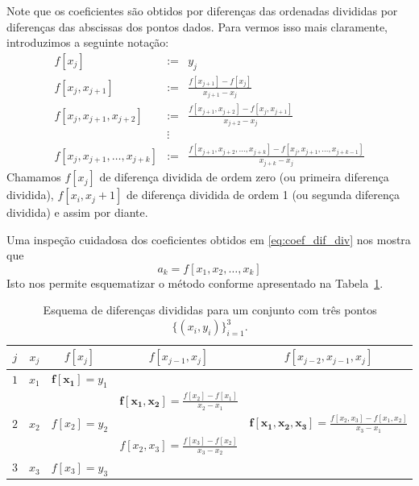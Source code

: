 Note que os coeficientes são obtidos por diferenças das ordenadas divididas por diferenças das abscissas dos pontos dados. Para vermos isso mais claramente, introduzimos a seguinte notação:
\begin{eqnarray}
  f[x_j]&:=&y_j\\
  f[x_j, x_{j+1}]&:=&\frac{f[x_{j+1}]-f[x_j]}{x_{j+1}-x_j}\\
  f[x_j, x_{j+1}, x_{j+2}]&:=&\frac{f[x_{j+1}, x_{j+2}]-f[x_j, x_{j+1}]}{x_{j+2}-x_j}\\
        &\vdots&\\
  f[x_j, x_{j+1}, \dotsc, x_{j+k}] &:=& \frac{f[x_{j+1}, x_{j+2}, \dotsc, x_{j+k}]-f[x_j, x_{j+1}, \dotsc, x_{j+k-1}]}{x_{j+k}-x_j}
\end{eqnarray}
Chamamos $f[x_j]$ de diferença dividida de ordem zero (ou primeira diferença dividida), $f[x_i,x_j+1]$ de diferença dividida de ordem 1 (ou segunda diferença dividida) e assim por diante.

Uma inspeção cuidadosa dos coeficientes obtidos em \eqref{eq:coef_dif_div} nos mostra que
\begin{equation}
 a_k=f[x_1,x_2,\ldots,x_k]
\end{equation}
Isto nos permite esquematizar o método conforme apresentado na Tabela~\ref{tab:esquema_difdiv}.

\begin{table}
  \centering
  \caption{Esquema de diferenças divididas para um conjunto com três pontos $\{(x_i, y_i)\}_{i=1}^3$.}
  \label{tab:esquema_difdiv}
\begin{tabular}{c||c|ccc}\hline
$j$ & $x_j$ & $f[x_j]$ & $f[x_{j-1},x_j]$ & $f[x_{j-2},x_{j-1},x_j]$ \\\hline
$1$ & $x_1$ & $\pmb{f[x_1]}=y_1$ & &\\
&&&$\displaystyle \pmb{f[x_1,x_2]}=\frac{f[x_2]-f[x_1]}{x_2-x_1}$&\\
$2$ & $x_2$ & $f[x_2] = y_2$ && $\displaystyle \pmb{f[x_1,x_2,x_3]}=\frac{f[x_2,x_3]-f[x_1,x_2]}{x_3-x_1}$\\
&&&$\displaystyle f[x_2,x_3]=\frac{f[x_3]-f[x_2]}{x_3-x_2}$ &\\
$3$ & $x_3$ & $f[x_3]=y_3$ &&\\\hline
\end{tabular}
\end{table}

